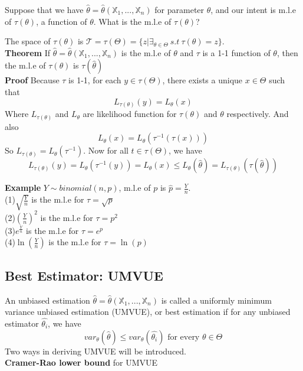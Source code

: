 Suppose that we have $\hat{\theta} = \hat{\theta}(\mathbb{X}_1, ..., \mathbb{X}_n)$ for parameter $\theta$, and our intent is m.l.e of $\tau(\theta)$, a function of $\theta$. What is the m.l.e of $\tau(\theta)$?

The space of $\tau(\theta)$ is $\mathcal{T} = \tau(\Theta) = \{ z | \exists_{\theta\in\Theta}\ s.t\ \tau(\theta) = z\}$.\\

\textbf{Theorem} If $\hat{\theta} = \hat{\theta}(\mathbb{X}_1, ..., \mathbb{X}_n)$ is the m.l.e of $\theta$ and $\tau$ is a 1-1 function of $\theta$, then the m.l.e of $\tau(\theta)$ is $\tau(\hat{\theta})$\\

\textbf{Proof} Because $\tau$ is 1-1, for each $y\in\tau(\Theta)$, there exists a unique $x\in\Theta$ such that
$$L_{\tau(\theta)}(y) = L_{\theta}(x)$$
Where $L_{\tau(\theta)}$ and $L_{\theta}$ are likelihood function for $\tau(\theta)$ and $\theta$ respectively. And also
$$L_{\theta}(x) = L_{\theta}(\tau^{-1}(\tau(x)))$$
So $L_{\tau(\theta)} =  L_{\theta}(\tau^{-1})$. Now for all $t\in\tau(\Theta)$, we have
$$L_{\tau(\theta)}(y) =  L_{\theta}(\tau^{-1}(y)) = L_{\theta}(x) \leq L_{\theta}(\hat{\theta}) = L_{\tau(\theta)}(\tau(\hat{\theta}))$$

\textbf{Example} $Y \sim binomial(n, p)$, m.l.e of $p$ is $\hat{p} = \frac{Y}{n}$.\\
(1)$\sqrt{\frac{Y}{n}}$ is the m.l.e for $\tau = \sqrt{p}$\\
(2)$(\frac{Y}{n})^2$ is the m.l.e for $\tau = p^2$\\
(3)$e^{\frac{Y}{n}}$ is the m.l.e for $\tau = e^p$\\
(4)$\ln(\frac{Y}{n})$ is the m.l.e for $\tau = \ln(p)$\\

\subsection{Best Estimator: UMVUE}

An unbiased estimation $\hat{\theta} = \hat{\theta}( \mathbb{X}_1, ..., \mathbb{X}_n )$ is called a uniformly minimum variance unbiased estimation (UMVUE), or best estimation if for any unbiased estimator $\hat{\theta_i}$, we have
$$var_\theta(\hat{\theta}) \leq var_\theta(\hat{\theta_i}) \text{ for every } \theta \in \Theta$$
Two ways in deriving UMVUE will be introduced.\\

\textbf{Cramer-Rao lower bound } for UMVUE\\

